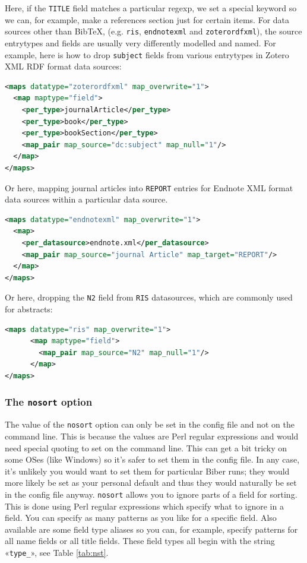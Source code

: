 \documentclass{ltxdockit}
\begin{document}
\noindent Here, if the \verb+TITLE+ field matches a particular
regexp, we set a special keyword so we can, for example, make a
references section just for certain items.
\bigskip
{}
For data sources other than Bib\TeX, (e.g. \verb+ris+,
\verb+endnotexml+ and \verb+zoterordfxml+), the source entrytypes and
fields are usually very differently modelled and named. For example, here
is how to drop \verb+subject+ fields from various entrytypes in Zotero XML
RDF format data sources:

\begin{lstlisting}[language=xml,escapechar=+,mathescape=true]
<maps datatype="zoterordfxml" map_overwrite="1">
  <map maptype="field">
    <per_type>journalArticle</per_type>
    <per_type>book</per_type>
    <per_type>bookSection</per_type>
    <map_pair map_source="dc:subject" map_null="1"/>
  </map>
</maps>
\end{lstlisting}

\noindent Or here, mapping journal articles into \verb+REPORT+ entries for
Endnote XML format data sources within a particular data source.

\begin{lstlisting}[language=xml,escapechar=+,mathescape=true]
<maps datatype="endnotexml" map_overwrite="1">
  <map>
    <per_datasource>endnote.xml</per_datasource>
    <map_pair map_source="journal Article" map_target="REPORT"/>
  </map>
</maps>
\end{lstlisting}

\noindent Or here, dropping the \verb+N2+ field from \verb+RIS+
datasources, which are commonly used for abstracts:

\begin{lstlisting}[language=xml,escapechar=+,mathescape=true]
<maps datatype="ris" map_overwrite="1">
      <map maptype="field">
        <map_pair map_source="N2" map_null="1"/>
      </map>
</maps>
\end{lstlisting}
\bigskip
\subsubsection{The \texttt{nosort} option}\label{nosort}

The value of the \verb+nosort+ option can only be set in the config file
and not on the command line. This is because the values are Perl regular
expressions and would need special quoting to set on the command line. This
can get a bit tricky on some OSes (like Windows) so it's safer to set them
in the config file. In any case, it's unlikely you would want to set them
for particular Biber runs; they would more likely be set as your
personal default and thus they would naturally be set in the config file
anyway. \verb+nosort+ allows you to ignore parts of a field for sorting.
This is done using Perl regular expressions which specify what to
ignore in a field. You can specify as many patterns as you like for a
specific field. Also available are some field type aliases so you can, for
example, specify patterns for all name fields or all title fields. These
field types all begin with the string «\verb+type_+», see Table
\ref{tab:nst}.
\end{document}

